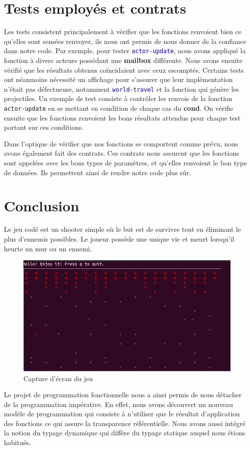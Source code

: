 \documentclass{article}
\begin{document}
\section{Tests employés et contrats}
Les tests consistent principalement à vérifier que les fonctions renvoient bien ce qu'elles sont sensées renvoyer, ils nous ont permis de nous donner de la confiance dans notre code. Par exemple, pour tester \textcolor{blue}{\lstinline{actor-update}}, nous avons appliqué la fonction à divers acteurs possédant une \textbf{mailbox} différente. Nous avons ensuite vérifié que les résultats obtenus coïncidaient avec ceux escomptés. Certains tests ont néanmoins nécessité un affichage pour s'assurer que leur implémentation n'était pas défectueuse, notamment \textcolor{blue}{\lstinline{world-travel}} et la fonction qui génère les projectiles.
\newline
Un exemple de test consiste à contrôler les renvois de la fonction \lstinline{actor-update} en se mettant en condition de chaque cas du \textbf{cond}. On vérifie ensuite que les fonctions renvoient les bons résultats attendus pour chaque test portant sur ces conditions. 

Dans l'optique de vérifier que nos fonctions se comportent comme prévu, nous avons également fait des contrats. Ces contrats nous assurent que les fonctions sont appelées avec les bons types de paramètres, et qu'elles renvoient le bon type de données. Ils permettent ainsi de rendre notre code plus sûr.

\section{Conclusion}
Le jeu codé est un shooter simple où le but est de survivre tout en éliminant le plus d'ennemis possibles. Le joueur possède une unique vie et meurt lorsqu'il heurte un mur ou un ennemi.
\begin{figure}[H]
    \centering
    \includegraphics[width = 12cm]{jeu.png}
    \caption{Capture d'écran du jeu}
    \label{Screenshot}
\end{figure}
Le projet de programmation fonctionnelle nous a ainsi permis de nous détacher de la programmation impérative. En effet, nous avons découvert un nouveau modèle de programmation qui consiste à n'utiliser que le résultat d'application des fonctions ce qui assure la transparence référentielle. Nous avons aussi intégré la notion du typage dynamique qui diffère du typage statique auquel nous étions habitués.
\label{LastPage}
\end{document}
